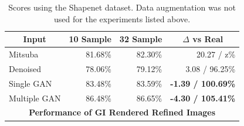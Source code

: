 \documentclass[10pt,twocolumn,letterpaper]{article}
\begin{document}
\begin{table}[]
\centering
\begin{tabular}{|l|r|r|r|}
\hline
\multicolumn{1}{|c|}{\textbf{Input}}
& \multicolumn{1}{c|}{\textbf{10 Sample}}
& \multicolumn{1}{c|}{\textbf{32 Sample}}
& \multicolumn{1}{c|}{\textbf{$\Delta$ vs Real}} \\ \hline
Mitsuba		& 81.68\%	& 82.30\%	& 20.27 / z\% \\
Denoised	& 78.06\%	& 79.12\%	& 3.08 / 96.25\%	\\
Single GAN	& 83.48\%	& 83.59\%	& \textbf{-1.39 / 100.69\%}	\\
Multiple GAN& 86.48\%	& 86.65\% 	& \textbf{-4.30 / 105.41\%}		\\ \hline
\multicolumn{4}{|c|}{\textbf{Performance of GI Rendered Refined Images}}	\\ \hline
\end{tabular}
\caption{Scores using the Shapenet dataset. Data augmentation was not used for the experiments listed above.}
\label{tblallrefined}
\end{table}
\end{document}
